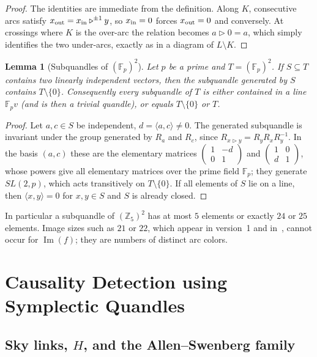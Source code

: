 \documentclass[11pt]{article}
\newtheorem{lemma}[theorem]{Lemma}
\theoremstyle{definition}
\newcommand{\Z}{\mathbb{Z}}
\newcommand{\F}{\mathbb{F}}
\renewcommand{\Im}{\operatorname{Im}}
\newcommand{\tr}{\triangleright}
\begin{document}
\begin{proof}
The identities are immediate from the definition. Along $K$, consecutive arcs satisfy
$x_{\rm out}=x_{\rm in}\tr^{\pm1}y$, so $x_{\rm in}=0$ forces $x_{\rm out}=0$ and conversely. At
crossings where $K$ is the over-arc the relation becomes $a\tr0=a$, which simply identifies the two
under-arcs, exactly as in a diagram of $L\setminus K$.
\end{proof}

\begin{lemma}[Subquandles of $(\F_p)^2$]\label{lem:subq}
Let $p$ be a prime and $T=(\F_p)^2$. If $S\subseteq T$ contains two linearly independent vectors, then
the subquandle generated by $S$ contains $T\setminus\{0\}$. Consequently every subquandle of $T$ is
either contained in a line $\F_p v$ (and is then a trivial quandle), or equals $T\setminus\{0\}$ or $T$.
\end{lemma}

\begin{proof}
Let $a,c\in S$ be independent, $d=\langle a,c\rangle\neq0$. The generated subquandle is invariant
under the group generated by $R_a$ and $R_c$, since $R_{x\tr y}=R_yR_xR_y^{-1}$. In the basis $(a,c)$
these are the elementary matrices $\begin{pmatrix}1&-d\\0&1\end{pmatrix}$ and
$\begin{pmatrix}1&0\\d&1\end{pmatrix}$, whose powers give all elementary matrices over the prime field
$\F_p$; they generate $SL(2,p)$, which acts transitively on $T\setminus\{0\}$. If all elements of $S$
lie on a line, then $\langle x,y\rangle=0$ for $x,y\in S$ and $S$ is already closed.
\end{proof}

In particular a subquandle of $(\Z_5)^2$ has at most $5$ elements or exactly $24$ or $25$ elements.
Image sizes such as $21$ or $22$, which appear in version~1 and in~\cite{Jai24}, cannot occur for
$\Im(f)$; they are numbers of distinct arc colors.

\section{Causality Detection using Symplectic Quandles}\label{sec:main}

\subsection{\texorpdfstring{Sky links, $H$, and the Allen--Swenberg family}{Sky links, H, and the Allen-Swenberg family}}\label{ssec:sky}
\end{document}

